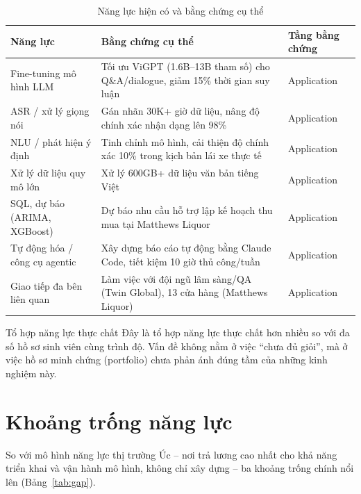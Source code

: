 \documentclass{reportkit}
\begin{document}
\begin{table}[H]
\caption{Năng lực hiện có và bằng chứng cụ thể}
\label{tab:evidence}
\centering
\begin{tabular}{p{3.1cm}p{7.3cm}l}
\toprule
Năng lực & Bằng chứng cụ thể & Tầng bằng chứng \\
\midrule
Fine-tuning mô hình LLM & Tối ưu ViGPT (1.6B--13B tham số) cho Q\&A/dialogue, giảm 15\%
  thời gian suy luận & Application \\
ASR / xử lý giọng nói & Gán nhãn 30K+ giờ dữ liệu, nâng độ chính xác nhận dạng lên
  98\% & Application \\
NLU / phát hiện ý định & Tinh chỉnh mô hình, cải thiện độ chính xác 10\% trong kịch
  bản lái xe thực tế & Application \\
Xử lý dữ liệu quy mô lớn & Xử lý 600GB+ dữ liệu văn bản tiếng Việt & Application \\
SQL, dự báo (ARIMA, XGBoost) & Dự báo nhu cầu hỗ trợ lập kế hoạch thu mua tại
  Matthews Liquor & Application \\
Tự động hóa / công cụ agentic & Xây dựng báo cáo tự động bằng Claude Code, tiết kiệm
  10 giờ thủ công/tuần & Application \\
Giao tiếp đa bên liên quan & Làm việc với đội ngũ lâm sàng/QA (Twin Global), 13 cửa
  hàng (Matthews Liquor) & Application \\
\bottomrule
\end{tabular}
\end{table}

\begin{evidencenote}{Tổ hợp năng lực thực chất}
Đây là tổ hợp năng lực thực chất hơn nhiều so với đa số hồ sơ sinh viên cùng trình độ.
Vấn đề không nằm ở việc ``chưa đủ giỏi'', mà ở việc hồ sơ minh chứng (portfolio) chưa
phản ánh đúng tầm của những kinh nghiệm này.
\end{evidencenote}

\section{Khoảng trống năng lực}
So với mô hình năng lực thị trường Úc -- nơi trả lương cao nhất cho khả năng triển
khai và vận hành mô hình, không chỉ xây dựng -- ba khoảng trống chính nổi lên
(Bảng~\ref{tab:gap}).
\end{document}
